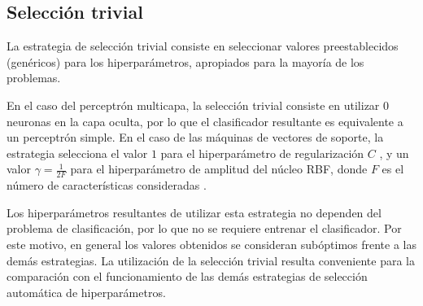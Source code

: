 %
%
\subsection{Selección trivial}
%
La estrategia de selección trivial consiste en seleccionar valores
preestablecidos (genéricos) para los hiperparámetros, apropiados para
la mayoría de los problemas.

En el caso del perceptrón multicapa, la selección trivial consiste en
utilizar $0$ neuronas en la capa oculta, por lo que el clasificador
resultante es equivalente a un perceptrón simple.  En el caso de las
máquinas de vectores de soporte, la estrategia selecciona el valor $1$
para el hiperparámetro de regularización $C$ \cite{libsvm}, y un valor
$\gamma=\frac{1}{2F}$ para el hiperparámetro de amplitud del núcleo
RBF, donde $F$ es el número de características consideradas
\cite{glasmachersigel}.

Los hiperparámetros resultantes de utilizar esta estrategia no
dependen del problema de clasificación, por lo que no se requiere
entrenar el clasificador. Por este motivo, en general los valores
obtenidos se consideran subóptimos frente a las demás estrategias.  La
utilización de la selección trivial resulta conveniente para la
comparación con el funcionamiento de las demás estrategias de
selección automática de hiperparámetros.
